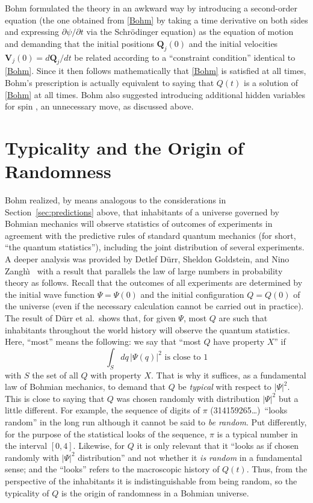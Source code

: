 \documentclass[12pt]{article}
\newcommand{\be}{\begin{equation}}
\newcommand{\ee}{\end{equation}}
\newcommand{\vQ}{\boldsymbol{Q}}
\newcommand{\vV}{\boldsymbol{V}}
\begin{document}
Bohm \cite{Bohm52} formulated the theory in an awkward way by introducing a second-order equation (the one obtained from \eqref{Bohm} by taking a time derivative on both sides and expressing $\partial\psi/\partial t$ via the Schr\"odinger equation) as the equation of motion and demanding that the initial positions $\vQ_j(0)$ and the initial velocities $\vV_j(0)=d\vQ_j/dt$ be related according to a ``constraint condition'' identical to \eqref{Bohm}. Since it then follows mathematically that \eqref{Bohm} is satisfied at all times, Bohm's prescription is actually equivalent to saying that $Q(t)$ is a solution of \eqref{Bohm} at all times. Bohm also suggested introducing additional hidden variables for spin \cite{BH}, an unnecessary move, as discussed above.



\section{Typicality and the Origin of Randomness}
\label{sec:typicality}

Bohm realized, by means analogous to the considerations in Section~\ref{sec:predictions} above, that inhabitants of a universe governed by Bohmian mechanics will observe statistics of outcomes of experiments in agreement with the predictive rules of standard quantum mechanics (for short, ``the quantum statistics''), including the joint distribution of several experiments. A deeper analysis was provided by Detlef D\"urr, Sheldon Goldstein, and Nino Zangh\`\i\  \cite{DGZ92} with a result that parallels the law of large numbers in probability theory as follows. Recall that the outcomes of all experiments are determined by the initial wave function $\Psi=\Psi(0)$ and the initial configuration $Q=Q(0)$ of the universe (even if the necessary calculation cannot be carried out in practice). The result of D\"urr et al.\ shows that, for given $\Psi$, most $Q$ are such that inhabitants throughout the world history will observe the quantum statistics.  Here, ``most'' means the following: we say that ``most $Q$ have property $X$'' if 
\be
\int_S dq\, |\Psi(q)|^2 \text{ is close to }1 
\ee 
with $S$ the set of all $Q$ with property $X$. That is why it suffices, as a fundamental law of Bohmian mechanics, to demand that $Q$ be \emph{typical} with respect to $|\Psi|^2$. This is close to saying that $Q$ was chosen randomly with distribution $|\Psi|^2$ but a little different. For example, the sequence of digits of $\pi$ (314159265\ldots)~``looks random'' in the long run although it cannot be said to \emph{be random}. Put differently, for the purpose of the statistical looks of the sequence, $\pi$ is a typical number in the interval $[0,4]$. Likewise, for $Q$ it is only relevant that it ``looks as if chosen randomly with $|\Psi|^2$ distribution'' and not whether it \emph{is random} in a fundamental sense; and the ``looks'' refers to the macroscopic history of $Q(t)$. Thus, from the perspective of the inhabitants it is indistinguishable from being random, so the typicality of $Q$ is the origin of randomness in a Bohmian universe.
\end{document}
